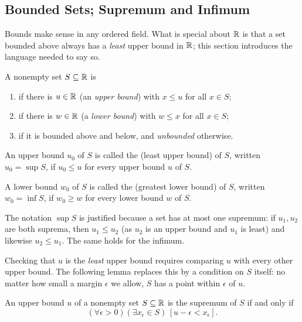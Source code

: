 \subsection{Bounded Sets; Supremum and Infimum}\label{sec:bounds}

Bounds make sense in any ordered field. What is special about $\mathbb{R}$ is that
a set bounded above always has a \emph{least} upper bound in $\mathbb{R}$; this
section introduces the language needed to say so.

\begin{definition}\label{def:bounded}
    A nonempty set $S \subseteq \mathbb{R}$ is
    \begin{enumerate}[label=(\arabic*)]
        \item {} if there is $u \in \mathbb{R}$ (an \emph{upper
        bound}) with $x \leq u$ for all $x \in S$;
        \item {} if there is $w \in \mathbb{R}$ (a \emph{lower
        bound}) with $w \leq x$ for all $x \in S$;
        \item {} if it is bounded above and below, and
        \emph{unbounded} otherwise.
    \end{enumerate}
\end{definition}

\begin{definition}\label{def:sup}
    An upper bound $u_0$ of $S$ is called the  (least upper
    bound) of $S$, written $u_0 = \sup S$, if $u_0 \leq u$ for every upper
    bound $u$ of $S$.

    A lower bound $w_0$ of $S$ is called the  (greatest lower
    bound) of $S$, written $w_0 = \inf S$, if $w_0 \geq w$ for every lower
    bound $w$ of $S$.
\end{definition}

The notation $\sup S$ is justified because a set has at most one supremum:
if $u_1,u_2$ are both suprema, then $u_1\leq u_2$ (as $u_2$ is an upper
bound and $u_1$ is least) and likewise $u_2\leq u_1$. The same holds for
the infimum.

Checking that $u$ is the \emph{least} upper bound requires comparing $u$ with
every other upper bound. The following lemma replaces this by a condition on
$S$ itself: no matter how small a margin $\epsilon$ we allow, $S$ has a point
within $\epsilon$ of $u$.

\begin{lemma}\label{lem:eps-sup}
    An upper bound $u$ of a nonempty set $S\subseteq\mathbb{R}$ is the supremum of
    $S$ if and only if
    \begin{equation*}
        (\forall \epsilon > 0)(\exists x_\epsilon \in S)\,[u - \epsilon < x_\epsilon].
    \end{equation*}
\end{lemma}

